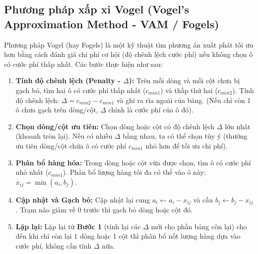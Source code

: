\subsection{Phương pháp xấp xỉ Vogel (Vogel's Approximation Method - VAM / Fogels)}

Phương pháp Vogel (hay Fogels) là một kỹ thuật tìm phương án xuất phát tối ưu hơn bằng cách đánh giá chi phí cơ hội (độ chênh lệch cước phí) nếu không chọn ô có cước phí thấp nhất. Các bước thực hiện như sau:

\begin{enumerate}
    \item \textbf{Tính độ chênh lệch (Penalty - $\Delta$):} Trên mỗi dòng và mỗi cột chưa bị gạch bỏ, tìm hai ô có cước phí thấp nhất ($c_{min1}$) và thấp thứ hai ($c_{min2}$). Tính độ chênh lệch: $\Delta = c_{min2} - c_{min1}$ và ghi ra rìa ngoài của bảng. (Nếu chỉ còn 1 ô chưa gạch trên dòng/cột, $\Delta$ chính là cước phí của ô đó).
    
    \item \textbf{Chọn dòng/cột ưu tiên:} Chọn dòng hoặc cột có độ chênh lệch $\Delta$ lớn nhất (khoanh tròn lại). Nếu có nhiều $\Delta$ bằng nhau, ta có thể chọn tùy ý (thường ưu tiên dòng/cột chứa ô có cước phí $c_{min1}$ nhỏ hơn để tối ưu chi phí).
    
    \item \textbf{Phân bổ hàng hóa:} Trong dòng hoặc cột vừa được chọn, tìm ô có cước phí nhỏ nhất ($c_{min1}$). Phân bổ lượng hàng tối đa có thể vào ô này: $x_{ij} = \min(a_i, b_j)$.
    
    \item \textbf{Cập nhật và Gạch bỏ:} Cập nhật lại cung $a_i \leftarrow a_i - x_{ij}$ và cầu $b_j \leftarrow b_j - x_{ij}$. Trạm nào giảm về 0 trước thì gạch bỏ dòng hoặc cột đó.
    
    \item \textbf{Lặp lại:} Lặp lại từ \textbf{Bước 1} (tính lại các $\Delta$ mới cho phần bảng còn lại) cho đến khi chỉ còn lại 1 dòng hoặc 1 cột thì phân bổ nốt lượng hàng dựa vào cước phí, không cần tính $\Delta$ nữa.
\end{enumerate}

